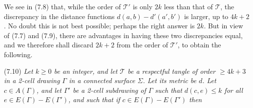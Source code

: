 We see in (7.8) that, while the order of $\mathscr{T}'$ is only $2k$ less than that of $\mathscr{T}$, the discrepancy in the distance functions $d(a, b) - d'(a', b')$ is larger, up to $4k + 2$. No doubt this is not best possible; perhaps the right answer is $2k$. But in view of (7.7) and (7.9), there are advantages in having these two discrepancies equal, and we therefore shall discard $2k + 2$ from the order of $\mathscr{T}'$, to obtain the following.

\stmt
(7.10) \textit{Let $k \ge 0$ be an integer, and let $\mathscr{T}$ be a respectful tangle of order $\ge 4k + 3$ in a 2-cell drawing $\Gamma$ in a connected surface $\Sigma$. Let its metric be $d$. Let $c \in A(\Gamma)$, and let $\Gamma'$ be a 2-cell subdrawing of $\Gamma$ such that $d(c, e) \le k$ for all $e \in E(\Gamma) - E(\Gamma')$, and such that if $c \in E(\Gamma) - E(\Gamma')$ then}
